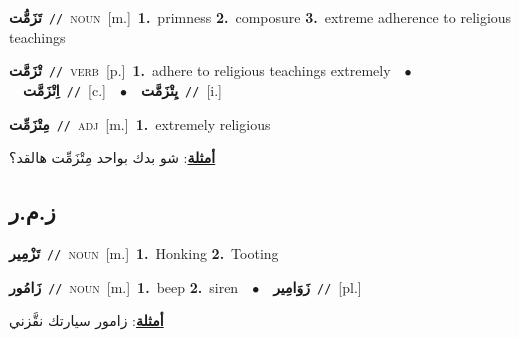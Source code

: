 \documentclass[10pt,a4paper,twoside]{article} %
\begin{document}
\begin{multicols}{2}
{\setlength\topsep{0pt}\textbf{\foreignlanguage{arabic}{تَزَمُّت}}\ {\color{gray}\texttt{//}\color{black}}\ \textsc{noun}\ [m.]\ \textbf{1.}~primness  \textbf{2.}~composure  \textbf{3.}~extreme adherence to religious teachings\ } \vspace{2mm}

{\setlength\topsep{0pt}\textbf{\foreignlanguage{arabic}{تْزَمَّت}}\ {\color{gray}\texttt{//}\color{black}}\ \textsc{verb}\ [p.]\ \textbf{1.}~adhere to religious teachings extremely\ \ $\bullet$\ \ \setlength\topsep{0pt}\textbf{\foreignlanguage{arabic}{اِتْزَمَّت}}\ {\color{gray}\texttt{//}\color{black}}\ [c.]\ \ $\bullet$\ \ \setlength\topsep{0pt}\textbf{\foreignlanguage{arabic}{يِتْزَمَّت}}\ {\color{gray}\texttt{//}\color{black}}\ [i.]\ } \vspace{2mm}

{\setlength\topsep{0pt}\textbf{\foreignlanguage{arabic}{مِتْزَمِّت}}\ {\color{gray}\texttt{//}\color{black}}\ \textsc{adj}\ [m.]\ \textbf{1.}~extremely religious\  \begin{flushright}\color{gray}\foreignlanguage{arabic}{\textbf{\underline{\foreignlanguage{arabic}{أمثلة}}}: شو بدك بواحد مِتْزَمِّت هالقد؟}\end{flushright}\color{black}} \vspace{2mm}

\vspace{-3mm}
\subsection*{\color{blue}\foreignlanguage{arabic}{ز.م.ر}\color{blue}{}} 

{\setlength\topsep{0pt}\textbf{\foreignlanguage{arabic}{تَزْمِير}}\ {\color{gray}\texttt{//}\color{black}}\ \textsc{noun}\ [m.]\ \textbf{1.}~Honking  \textbf{2.}~Tooting\ } \vspace{2mm}

{\setlength\topsep{0pt}\textbf{\foreignlanguage{arabic}{زَامُور}}\ {\color{gray}\texttt{//}\color{black}}\ \textsc{noun}\ [m.]\ \textbf{1.}~beep  \textbf{2.}~siren\ \ $\bullet$\ \ \setlength\topsep{0pt}\textbf{\foreignlanguage{arabic}{زَوَامِير}}\ {\color{gray}\texttt{//}\color{black}}\ [pl.]\  \begin{flushright}\color{gray}\foreignlanguage{arabic}{\textbf{\underline{\foreignlanguage{arabic}{أمثلة}}}: زامور سيارتك نقَّزني}\end{flushright}\color{black}} \vspace{2mm}


\end{multicols}
\end{document}
